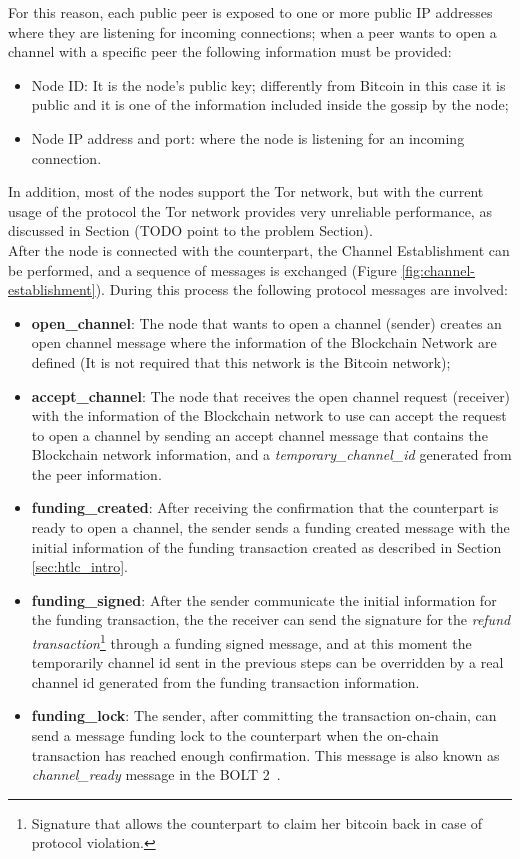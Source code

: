 For this reason, each public peer is exposed to one or more public IP addresses where
they are listening for incoming connections; when a peer wants to open
a channel with a specific peer the following information must be provided:

\begin{itemize}
  \item Node ID: It is the node's public key; differently from Bitcoin in this case it is public and it is one of the information included inside the gossip by the node;
  \item Node IP address and port: where the node is listening for an incoming connection.
\end{itemize}

In addition, most of the nodes support the Tor network, but with the current usage of the protocol the Tor network provides very unreliable
performance, as discussed in Section (TODO point to the problem Section).\\
After the node is connected with the counterpart, the Channel Establishment can be performed, and a sequence
of messages is exchanged (Figure \ref{fig:channel-establishment}). During this process
the following protocol messages are involved:

\begin{itemize}
  \item {\bf open\_channel}: The node that wants to open a channel (sender) creates an open channel message where the information of the
        Blockchain Network are defined (It is not required that this network is the Bitcoin network);
  \item {\bf accept\_channel}: The node that receives the open channel request (receiver) with the information of the Blockchain network to use
        can accept the request to open a channel by sending an accept channel message that contains the Blockchain network information, and
        a \emph{temporary\_channel\_id} generated from the peer information.
  \item {\bf funding\_created}: After receiving the confirmation that the counterpart is ready to open a channel, the sender
        sends a funding created message with the initial information of the funding transaction created as described in Section \ref{sec:htlc_intro}.
  \item {\bf funding\_signed}: After the sender communicate the initial information for the funding transaction, the
        the receiver can send the signature for the \emph{refund transaction}\footnote{Signature that allows the counterpart to claim her bitcoin back in case of protocol violation.} through a funding signed message, and at this moment the temporarily
        channel id sent in the previous steps can be overridden by a real channel id generated from the funding transaction information.
  \item {\bf funding\_lock}: The sender, after committing the transaction on-chain, can send a message funding lock to the counterpart when
        the on-chain transaction has reached enough confirmation. This message is also known as \emph{channel\_ready} message in the BOLT 2~\cite{bolt2}.
\end{itemize}

